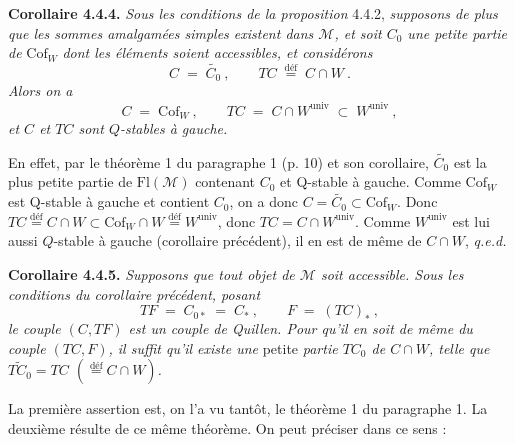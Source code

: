 \documentclass[11pt]{article}
\newcommand{\msp}[1]{\marginpar{\footnotesize [#1]}}
\newcommand{\Fl}{\mathrm{Fl}}
\newcommand{\Cof}{\mathrm{Cof}}
\newcommand{\deq}{\overset{\text{déf}}{=}}
\newcommand{\univ}{\mathrm{univ}}
\begin{document}
\textbf{Corollaire 4.4.4.} \textit{Sous les conditions de la proposition} 4.4.2, \textit{supposons de plus que les sommes amalgamées simples existent dans $\mathcal{M}$, et soit $C_0$ une petite partie de} $\Cof_W$ \textit{dont les éléments soient accessibles, et considérons}
\[
C\;=\;\widetilde{C_0}\ ,\qquad TC\;\deq\;C\cap W\ .
\]
\textit{Alors on a}
\[
C\;=\;\Cof_W\ ,\qquad TC\;=\;C\cap W^{\univ}\;\subset\;W^{\univ}\ ,
\]
\msp{page 41}
\textit{et $C$ et $TC$ sont $Q$-stables à gauche.}

En effet, par le théorème 1 du paragraphe 1 (p. 10) et son corollaire, $\widetilde{C_0}$ est la plus petite partie de $\Fl(\mathcal{M})$ contenant $C_0$ et Q-stable à gauche. Comme $\Cof_W$ est Q-stable à gauche et contient $C_0$, on a donc $C=\widetilde{C_0}\subset\Cof_W$. Donc $TC\deq C{\cap}W\subset\Cof_W{\cap}W\deq W^{\univ}$, donc $TC=C\cap W^{\univ}$. Comme $W^{\univ}$ est lui aussi $Q$-stable à gauche (corollaire précédent), il en est de même de $C\cap W$, \quad \textit{q.e.d.}

\textbf{Corollaire 4.4.5.} \textit{Supposons que tout objet de $\mathcal{M}$ soit accessible. Sous les conditions du corollaire précédent, posant}
\[
TF\;=\;C_{0*}\;=\;C_*\ ,\qquad F\;=\;(TC)_*\ ,
\]
\textit{le couple $(C,TF)$ est un couple de Quillen. Pour qu'il en soit de même du couple $(TC,F)$, il suffit qu'il existe une} petite \textit{partie $TC_0$ de $C\cap W$, telle que $\widetilde{TC_0}=TC$ $(\deq C\cap W)$.}

La première assertion est, on l'a vu tantôt, le théorème 1 du paragraphe 1. La deuxième résulte de ce même théorème. On peut préciser dans ce sens :
\end{document}
